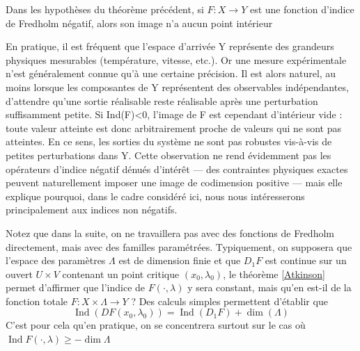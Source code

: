 \documentclass[memoire.tex]{subfiles}
\begin{document}
\begin{corollaire}
    Dans les hypothèses du théorème précédent,
    si $F:X\rightarrow Y$ est une fonction d'indice de Fredholm négatif, alors son image n'a aucun point intérieur 
\end{corollaire}
\begin{remarque}
    En pratique, il est fréquent que l’espace d’arrivée Y représente des grandeurs physiques mesurables (température, vitesse, etc.). Or une mesure expérimentale n’est généralement connue qu’à une certaine précision. Il est alors naturel, au moins lorsque les composantes de Y représentent des observables indépendantes, d’attendre qu’une sortie réalisable reste réalisable après une perturbation suffisamment petite. Si Ind(F)<0, l’image de F est cependant d’intérieur vide : toute valeur atteinte est donc arbitrairement proche de valeurs qui ne sont pas atteintes. En ce sens, les sorties du système ne sont pas robustes vis-à-vis de petites perturbations dans Y. Cette observation ne rend évidemment pas les opérateurs d’indice négatif dénués d’intérêt — des contraintes physiques exactes peuvent naturellement imposer une image de codimension positive — mais elle explique pourquoi, dans le cadre considéré ici, nous nous intéresserons principalement aux indices non négatifs.
\end{remarque}

Notez que dans la suite, on ne travaillera pas avec des fonctions de Fredholm directement, mais avec des familles paramétrées. Typiquement, on supposera que l'espace des paramètres $\Lambda$ est de dimension finie et que $D_1 F$ est continue sur un ouvert $U\times V$ contenant un point critique 
$(x_0,\lambda_0)$, le théorème \ref{Atkinson} permet d'affirmer que l'indice de $F(\cdot,\lambda)$ y sera constant, mais qu'en est-il de la fonction totale $F:X\times \Lambda\rightarrow Y$ ?
Des calculs simples permettent d'établir que
\begin{equation*}
   \operatorname*{Ind}(DF(x_0,\lambda_0))
   =\operatorname*{Ind}(D_1F)+ \dim(\Lambda)
\end{equation*}
C'est pour cela qu'en pratique, on se concentrera surtout sur le cas où $ \operatorname*{Ind}F(\cdot,\lambda)\geq -\dim \Lambda$
\end{document}
